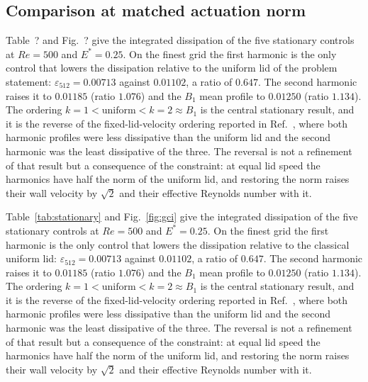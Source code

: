 \documentclass[11pt,a4paper]{article}
\newenvironment{chgadd}{\par\color{blue}}{\par\color{black}}
\newenvironment{chgdel}{\par\color{red}}{\par\color{black}}
\begin{document}
\subsection{Comparison at matched actuation norm}

\begin{chgdel}
Table~? and Fig.~? give the integrated dissipation
of the five stationary controls at $Re=500$ and $E^\ast=0.25$. On the finest grid
the first harmonic is the only control that lowers the dissipation relative to the
uniform lid of the problem statement: $\varepsilon_{512}=0.00713$ against
$0.01102$, a ratio of $0.647$. The second harmonic raises it to $0.01185$
(ratio $1.076$) and the $B_1$ mean profile to $0.01250$ (ratio $1.134$). The
ordering $k=1<\text{uniform}<k=2\approx B_1$ is the central stationary result, and
it is the reverse of the fixed-lid-velocity ordering reported in
Ref.~, where both harmonic profiles were less dissipative than
the uniform lid and the second harmonic was the least dissipative of the three.
The reversal is not a refinement of that result but a consequence of the
constraint: at equal lid speed the harmonics have half the norm of the uniform
lid, and restoring the norm raises their wall velocity by $\sqrt2$ and their
effective Reynolds number with it.
\end{chgdel}

\begin{chgadd}
Table~\ref{tab:stationary} and Fig.~\ref{fig:gci} give the integrated dissipation
of the five stationary controls at $Re=500$ and $E^\ast=0.25$. On the finest grid
the first harmonic is the only control that lowers the dissipation relative to the
classical uniform lid: $\varepsilon_{512}=0.00713$ against
$0.01102$, a ratio of $0.647$. The second harmonic raises it to $0.01185$
(ratio $1.076$) and the $B_1$ mean profile to $0.01250$ (ratio $1.134$). The
ordering $k=1<\text{uniform}<k=2\approx B_1$ is the central stationary result, and
it is the reverse of the fixed-lid-velocity ordering reported in
Ref.~\cite{beniaiche2026}, where both harmonic profiles were less dissipative than
the uniform lid and the second harmonic was the least dissipative of the three.
The reversal is not a refinement of that result but a consequence of the
constraint: at equal lid speed the harmonics have half the norm of the uniform
lid, and restoring the norm raises their wall velocity by $\sqrt2$ and their
effective Reynolds number with it.
\end{chgadd}
\end{document}
